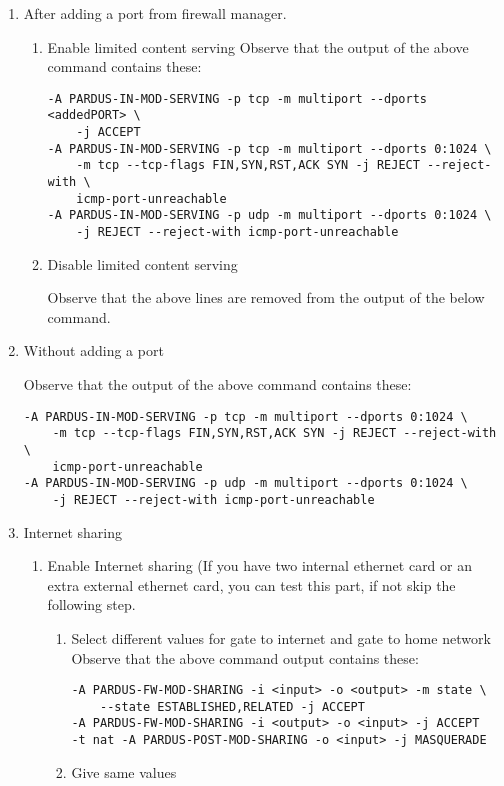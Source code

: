 \documentclass[a4paper,10pt]{article}
\begin{document}
\begin{enumerate}
\begin{enumerate}
     \item After adding a port from firewall manager.
        \begin{enumerate}
        \item Enable limited content serving
            	Observe that the output of the above command contains these: 
\begin{verbatim}
-A PARDUS-IN-MOD-SERVING -p tcp -m multiport --dports <addedPORT> \
    -j ACCEPT
-A PARDUS-IN-MOD-SERVING -p tcp -m multiport --dports 0:1024 \
    -m tcp --tcp-flags FIN,SYN,RST,ACK SYN -j REJECT --reject-with \
    icmp-port-unreachable
-A PARDUS-IN-MOD-SERVING -p udp -m multiport --dports 0:1024 \
    -j REJECT --reject-with icmp-port-unreachable
\end{verbatim} 
        \item Disable limited content serving

              Observe that the above lines are removed from the output of the below command.
        \end{enumerate}
    \item Without adding a port

        Observe that the output of the above command contains these:

\begin{verbatim}
-A PARDUS-IN-MOD-SERVING -p tcp -m multiport --dports 0:1024 \
    -m tcp --tcp-flags FIN,SYN,RST,ACK SYN -j REJECT --reject-with \
    icmp-port-unreachable
-A PARDUS-IN-MOD-SERVING -p udp -m multiport --dports 0:1024 \
    -j REJECT --reject-with icmp-port-unreachable
\end{verbatim} 


\item Internet sharing
    \begin{enumerate}
    \item Enable Internet sharing
    	(If you have two internal ethernet card or an extra external ethernet card, you can test this part, if not skip the following step.
        \begin{enumerate}

        \item Select different values for gate to internet and gate to home network
            	Observe that the above command output contains these:
\begin{verbatim}
-A PARDUS-FW-MOD-SHARING -i <input> -o <output> -m state \
    --state ESTABLISHED,RELATED -j ACCEPT
-A PARDUS-FW-MOD-SHARING -i <output> -o <input> -j ACCEPT
-t nat -A PARDUS-POST-MOD-SHARING -o <input> -j MASQUERADE
\end{verbatim} 
        \item Give same values


\end{enumerate}
\end{enumerate}
\end{enumerate}
\end{enumerate}
\end{document}
